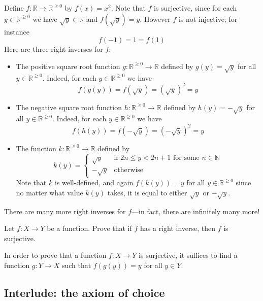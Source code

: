 \begin{example}
Define $f : \mathbb{R} \to \mathbb{R}^{\ge 0}$ by $f(x)=x^2$. Note that $f$ is surjective, since for each $y \in \mathbb{R}^{\ge 0}$ we have $\sqrt{y} \in \mathbb{R}$ and $f(\sqrt{y}) = y$. However $f$ is not injective; for instance
\[ f(-1) = 1 = f(1) \]
Here are three right inverses for $f$:
\begin{itemize}
\item The positive square root function $g : \mathbb{R}^{\ge 0} \to \mathbb{R}$ defined by $g(y)=\sqrt{y}$ for all $y \in \mathbb{R}^{\ge 0}$. Indeed, for each $y \in \mathbb{R}^{\ge 0}$ we have
\[ f(g(y)) = f(\sqrt{y}) = (\sqrt{y})^2 = y \]
\item The negative square root function $h : \mathbb{R}^{\ge 0} \to \mathbb{R}$ defined by $h(y)=-\sqrt{y}$ for all $y \in \mathbb{R}^{\ge 0}$. Indeed, for each $y \in \mathbb{R}^{\ge 0}$ we have
\[ f(h(y)) = f(-\sqrt{y}) = (-\sqrt{y})^2 = y \]
\item The function $k : \mathbb{R}^{\ge 0} \to \mathbb{R}$ defined by
\[ k(y) = \begin{cases}
\sqrt{y} & \text{if } 2n \le y < 2n+1 \text{ for some } n \in \mathbb{N} \\
-\sqrt{y} & \text{otherwise}
\end{cases} \]
Note that $k$ is well-defined, and again $f(k(y)) = y$ for all $y \in \mathbb{R}^{\ge 0}$ since no matter what value $k(y)$ takes, it is equal to either $\sqrt{y}$ or $-\sqrt{y}$.
\end{itemize}
There are many more right inverses for $f$---in fact, there are infinitely many more!
\end{example}

\begin{exercise}
Let $f : X \to Y$ be a function. Prove that if $f$ has a right inverse, then $f$ is surjective.
\end{exercise}

\begin{strategy}
In order to prove that a function $f : X \to Y$ is surjective, it suffices to find a function $g : Y \to X$ such that $f(g(y)) = y$ for all $y \in Y$.
\end{strategy}

\subsection*{Interlude: the axiom of choice}

